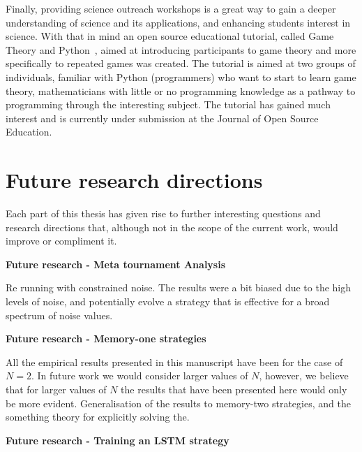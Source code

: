 Finally, providing science outreach workshops is a great way to gain a deeper
understanding of science and its applications, and enhancing students interest
in science. With that in mind an open source educational tutorial, called Game
Theory and Python~\cite{Glynatsi2017_game}, aimed at introducing participants to
game theory and more specifically to repeated games was created. The tutorial is
aimed at two groups of individuals, familiar with Python (programmers) who want
to start to learn game theory, mathematicians with little or no programming
knowledge as a pathway to programming through the interesting subject. The
tutorial has gained much interest and is currently under submission at the
Journal of Open Source Education.

\section{Future research directions}

Each part of this thesis has given rise to further interesting questions and
research directions that, although not in the scope of the current work, would
improve or compliment it.

\textbf{Future research - Meta tournament Analysis}

Re running with constrained noise. The results were a bit biased due to
the high levels of noise, and potentially evolve a strategy that is effective
for a broad spectrum of noise values.

\textbf{Future research - Memory-one strategies}

All the empirical results presented in this manuscript have been for the
case of $N=2$. In future work we would consider larger values of $N$, however, we
believe that for larger values of $N$ the results that have been presented here would
only be more evident. Generalisation of the results to memory-two strategies, and
the something theory for explicitly solving the.

\textbf{Future research - Training an LSTM strategy}

